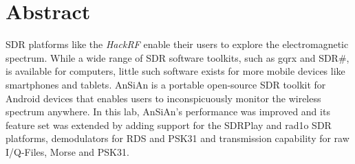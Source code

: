 \begingroup
\let\clearpage\relax
\let\cleardoublepage\relax
\let\cleardoublepage\relax

\chapter*{Abstract}

SDR platforms like the \emph{HackRF} enable their users to explore the electromagnetic spectrum. While a wide range of SDR software toolkits, such as gqrx and SDR\#{}, is available for computers, little such software exists for more mobile devices like smartphones and tablets. AnSiAn is a portable open-source SDR toolkit for Android devices that enables users to inconspicuously monitor the wireless spectrum anywhere. In this lab, AnSiAn's performance was improved and its feature set was extended by adding support for the SDRPlay and rad1o SDR platforms, demodulators for RDS and PSK31 and transmission capability for raw I/Q-Files, Morse and PSK31.



\vfill



\endgroup			

\vfill